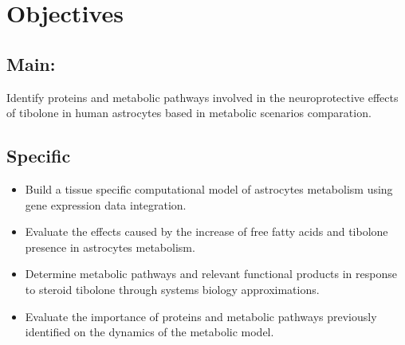 \chapter*{Objectives}
\section*{Main:}
Identify proteins and metabolic pathways involved in the neuroprotective effects of tibolone in human astrocytes based in metabolic scenarios comparation.
\section*{Specific}
\begin{itemize}
\item Build a tissue specific computational model of astrocytes metabolism using gene expression data integration.
\item Evaluate the effects caused by the increase of free fatty acids and tibolone presence in astrocytes metabolism.
\item Determine metabolic pathways and relevant functional products in response to steroid tibolone through systems biology approximations.
\item Evaluate the importance of proteins and metabolic pathways previously identified on the dynamics of the metabolic model.
\end{itemize}